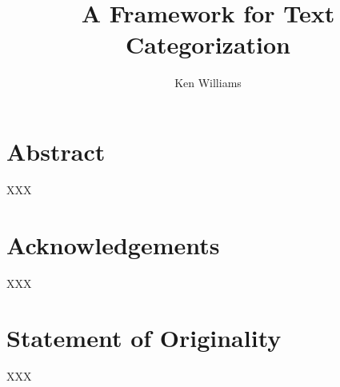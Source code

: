 \documentclass[a4paper]{report}
\title{A Framework for Text Categorization}
\author{Ken Williams}
\begin{document}
\newcommand{\method}[1]{\texttt{#1()}}
\newcommand{\class}[1]{\texttt{#1}}
\newcommand{\aicat}{\texttt{AI::Cat\-e\-gor\-i\-zer}}

\maketitle
\chapter*{Abstract}
XXX
\chapter*{Acknowledgements}
XXX
\chapter*{Statement of Originality}
XXX
\tableofcontents










\end{document}

